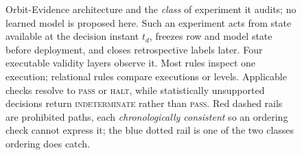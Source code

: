 \begin{figure}[!t]
\caption{Orbit-Evidence architecture and the \emph{class} of experiment it audits; no learned
model is proposed here. Such an experiment acts from state
available at the decision instant $t_d$, freezes row and model state before deployment, and closes
retrospective labels later. Four executable validity layers observe it. Most rules inspect one execution; relational rules compare
executions or levels. Applicable checks resolve
to \textsc{pass} or \textsc{halt}, while statistically unsupported decisions return
\textsc{indeterminate} rather than \textsc{pass}. Red dashed rails are prohibited paths, each
\emph{chronologically consistent} so an ordering check cannot express it; the blue dotted rail is
one of the two classes ordering does catch.}
\label{fig:contract}
\end{figure}
